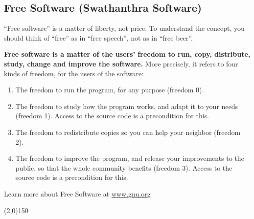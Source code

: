 \begin{english}
\section*{Free Software (Swathanthra Software)}

“Free software” is a matter of liberty, not price. To understand the concept, you should think of “free” as in “free speech”, not as in “free beer”.

\textbf{Free software is a matter of the users' freedom to run, copy, distribute, study, change and improve the software.} More precisely, it refers to four kinds of freedom, for the users of the software:
\begin{enumerate}
 \itemsep0em
 \item The freedom to run the program, for any purpose (freedom 0).
 \item The freedom to study how the program works, and adapt it to your needs (freedom 1). Access to the source code is a precondition for this.
 \item The freedom to redistribute copies so you can help your neighbor (freedom 2).
 \item The freedom to improve the program, and release your improvements to the public, so that the whole community benefits (freedom 3). Access to the source code is a precondition for this.
\end{enumerate}

Learn more about Free Software at \mbox{\url{www.gnu.org}}
\begin{center}
\line(2,0){150}
\end{center}
\end{english}
